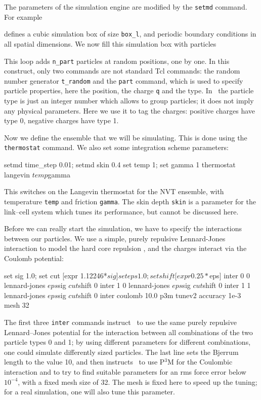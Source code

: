 The parameters of the simulation engine are modified by the \verb|setmd|
command. For example
defines a cubic simulation box of size \verb|box_l|, and periodic boundary
conditions in all spatial dimensions. We now fill this simulation box with
particles
This loop adds \verb|n_part| particles at random positions, one by one.  In this
construct, only two commands are not standard Tcl commands: the random
number generator \verb|t_random| and the \verb|part| command, which is used to
specify particle properties, here the position, the charge \verb|q| and the
type. In \es\ the particle type is just an integer number which allows to group
particles; it does not imply any physical parameters. Here we use it to tag the
charges: positive charges have type 0, negative charges have type 1.

Now we define the ensemble that we will be simulating. This is done using the
\verb|thermostat| command. We also set some integration scheme parameters:
\begin{tclcode}
setmd time_step 0.01; setmd skin 0.4
set temp 1; set gamma 1
thermostat langevin $temp $gamma
\end{tclcode}
This switches on the Langevin thermostat for the NVT ensemble, with temperature
\verb|temp| and friction \verb|gamma|. The skin depth \verb|skin| is a parameter
for the link--cell system which tunes its performance, but cannot be discussed
here.

Before we can really start the simulation, we have to specify the interactions
between our particles.  We use a simple, purely repulsive Lennard-Jones
interaction to model the hard core repulsion \cite{grest86a}, and the charges interact via the
Coulomb potential:
\begin{tclcode}
set sig 1.0; set cut   [expr 1.12246*$sig]
set eps 1.0; set shift [expr 0.25*$eps]
inter 0 0 lennard-jones $eps $sig $cut $shift 0
inter 1 0 lennard-jones $eps $sig $cut $shift 0
inter 1 1 lennard-jones $eps $sig $cut $shift 0
inter coulomb 10.0 p3m tunev2 accuracy 1e-3 mesh 32
\end{tclcode}
The first three \verb|inter| commands instruct \es\ to use the same purely
repulsive Lennard--Jones potential for the interaction between all combinations
of the two particle types 0 and 1; by using different parameters for different
combinations, one could simulate differently sized particles.  The last line sets
the Bjerrum length to the value 10, and then
instructs \es\ to use P$^3$M for the Coulombic interaction and to try to find
suitable parameters for an rms force error below $10^{-4}$, with a fixed mesh
size of 32. The mesh is fixed here to speed up the tuning; for a real
simulation, one will also tune this parameter.

